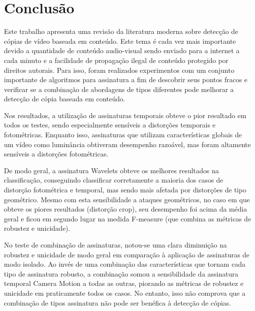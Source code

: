 
\chapter{Conclusão}
\label{chap:conclusao}

Este trabalho apresenta uma revisão da literatura moderna sobre detecção de cópias de vídeo baseada em conteúdo. Este tema é cada vez mais importante devido a quantidade de conteúdo audio-visual sendo enviado para a internet a cada minuto e a facilidade de propagação ilegal de conteúdo protegido por direitos autorais. Para isso, foram realizados experimentos com um conjunto importante de algoritmos para assinatura a fim de descobrir seus pontos fracos e verificar se a combinação de abordagens de tipos diferentes pode melhorar a detecção de cópia baseada em conteúdo.

Nos resultados, a utilização de assinaturas temporais obteve o pior resultado em todos os testes, sendo especialmente sensíveis a distorções temporais e fotométricas. Enquanto isso, assinaturas que utilizam características globais de um vídeo como luminância obtiveram desempenho razoável, mas foram altamente sensíveis a distorções fotométricas.

De modo geral, a assinatura Wavelets obteve os melhores resultados na classificação, conseguindo classificar corretamente a maioria dos casos de distorção fotométrica e temporal, mas sendo mais afetada por distorções de tipo geométrico. Mesmo com esta sensibilidade a ataques geométricos, no caso em que obteve os piores resultados (distorção crop), seu desempenho foi acima da média geral e ficou em segundo lugar na medida F-measure (que combina as métricas de robustez e unicidade).

No teste de combinação de assinaturas, notou-se uma clara diminuição na robustez e unicidade de modo geral em comparação à aplicação de assinaturas de modo isolado. Ao invés de uma combinação das características que tornam cada tipo de assinatura robusto, a combinação somou a sensibilidade da assinatura temporal Camera Motion a todas as outras, piorando as métricas de robustez e unicidade em praticamente todos os casos. No entanto, isso não comprova que a combinação de tipos assinatura não pode ser benéfica à detecção de cópias. 



